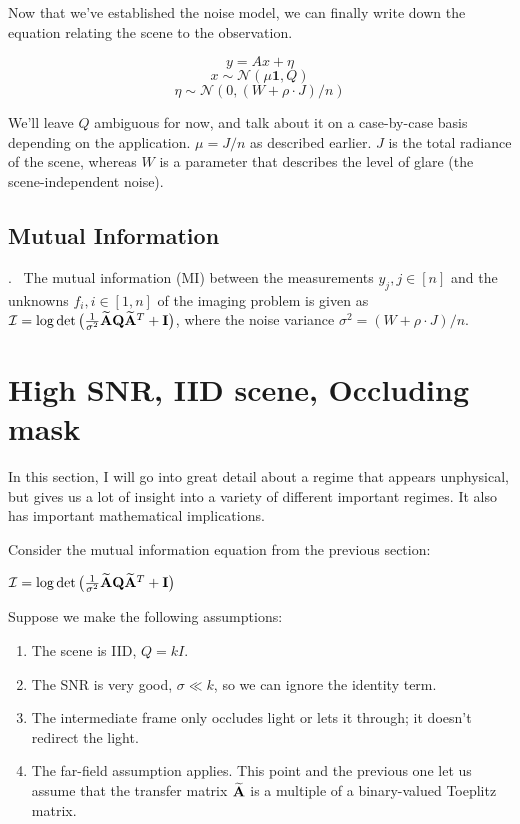 Now that we've established the noise model, we can finally write down the equation relating the scene to the observation.

$$y = Ax + \eta$$
$$x \sim \mathcal{N}(\mu\mathbf{1}, Q)$$
$$\eta \sim \mathcal{N}(0,(W+\rho\cdot J)/n)$$

We'll leave $Q$ ambiguous for now, and talk about it on a case-by-case basis depending on the application. $\mu = J/n$ as described earlier. $J$ is the total radiance of the scene, whereas $W$ is a parameter that describes the level of glare (the scene-independent noise).

\subsection{Mutual Information}    

.~ The  mutual information (MI) between the measurements $y_j, j\in[n]$ and the unknowns $f_i, i\in[1,n]$ of the imaging problem is given as 
$\MI = %
\log\det\big( \frac{1}{\sigma^2}\An\Q\An^T + \Id \big)$, where the noise variance $\sigma^2 = (W + \rho \cdot J)/n$.

 
\section{High SNR, IID scene, Occluding mask}

In this section, I will go into great detail about a regime that appears unphysical, but gives us a lot of insight into a variety of different important regimes. It also has important mathematical implications.

Consider the mutual information equation from the previous section:

$\MI = %
\log\det\big( \frac{1}{\sigma^2}\An\Q\An^T + \Id \big)$

Suppose we make the following assumptions:

\begin{enumerate}
    \item The scene is IID, $Q = kI$.
    \item The SNR is very good, $\sigma \ll k$, so we can ignore the identity term.
    \item The intermediate frame only occludes light or lets it through; it doesn't redirect the light.
    \item The far-field assumption applies. This point and the previous one let us assume that the transfer matrix $\widetilde{\mathbf{A}}$ is a multiple of a binary-valued Toeplitz matrix.
\end{enumerate}    

